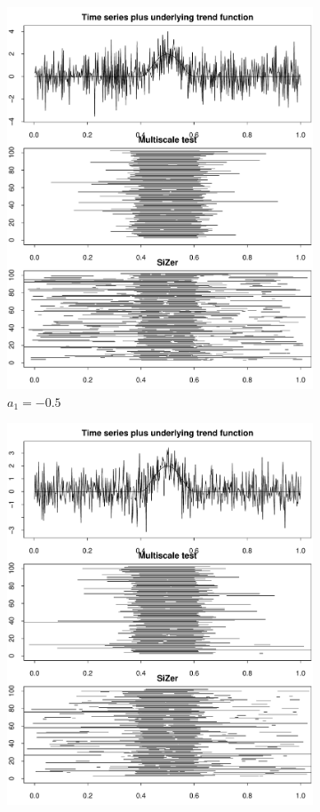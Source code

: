 \documentclass[a4paper,12pt]{article}
\begin{document}
\begin{figure}
\begin{subfigure}{.5\textwidth}
  \centering
  \includegraphics[width=.9\linewidth]{Plots/min_int_with_T_500_a1_-50.pdf}
  \caption{$a_1 = -0.5$}
  \label{fig:sfig1}
\end{subfigure}%
\begin{subfigure}{.5\textwidth}
  \centering
  \includegraphics[width=.9\linewidth]{Plots/min_int_with_T_500_a1_-25.pdf}

\end{subfigure}
\end{figure}
\end{document}
